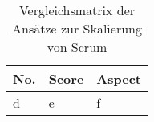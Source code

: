 \begin{table}[h]
    \begin{tabularx}{\textwidth}{|l|l|X|}
        \hline
        \textbf{No.} & \textbf{Score} & \textbf{Aspect} \\ \hline
        d            & e              & f               \\ \hline
    \end{tabularx}
    \caption{Vergleichsmatrix der Ansätze zur Skalierung von Scrum}
    \label{tab:execution.result-matrix}
\end{table}